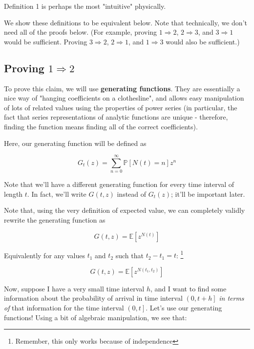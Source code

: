 \documentclass{article}
\begin{document}
Definition 1 is perhaps the most "intuitive" physically. 

We show these definitions to be equivalent below. Note that technically, we don't need all of the proofs below. (For example, proving $1 \Rightarrow 2$, $2 \Rightarrow 3$, and $3 \Rightarrow 1$ would be sufficient. Proving $3 \Rightarrow 2$, $2 \Rightarrow 1$, and $1 \Rightarrow 3$ would also be sufficient.) 


\subsection{Proving $1 \Rightarrow 2$}


To prove this claim, we will use \textbf{generating functions}. They are essentially a nice way of "hanging coefficients on a clothesline", and allows easy manipulation of lots of related values using the properties of power series (in particular, the fact that series representations of analytic functions are unique - therefore, finding the function means finding all of the correct coefficients).

Here, our generating function will be defined as 

\begin{equation}
G_t(z) = \sum_{n=0}^\infty \mathbb{P}[N(t) = n] z^n
\end{equation}

Note that we'll have a different generating function for every time interval of length $t$. In fact, we'll write $G(t, z)$ instead of $G_t(z)$; it'll be important later.

Note that, using the very definition of expected value, we can completely validly rewrite the generating function as 

\begin{equation}
G(t, z) = \mathbb{E}[z^{N(t)}]
\end{equation}

Equivalently for any values $t_1$ and $t_2$ such that $t_2 - t_1 = t$: \footnote{Remember, this only works because of independence}

\begin{equation}
G(t, z) = \mathbb{E}[z^{N(t_1, t_2)}]
\end{equation}


Now, suppose I have a very small time interval $h$, and I want to find some information about the probability of arrival in time interval $\left(0, t+h\right]$ \textit{in terms of} that information for the time interval $\left(0, t\right]$. Let's use our generating functions! Using a bit of algebraic manipulation, we see that:
\end{document}
